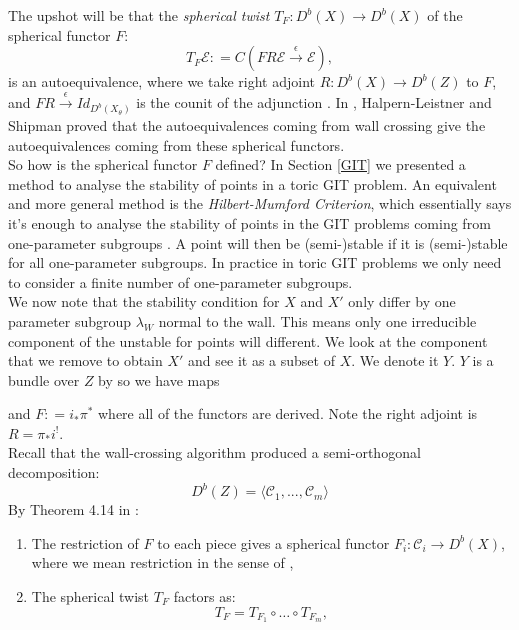 \documentclass[oneside]{amsart}
\theoremstyle{definition}
\theoremstyle{definition}
\theoremstyle{definition}
\theoremstyle{definition}
\newcommand{\defeq}{\mathrel{\mathop:}=}
\newcommand{\Es}{\mathcal{E}}
\begin{document}
The upshot will be that the \textit{spherical twist} $T_F: D^b(X) \to D^b(X)$ of the spherical functor $F$:
\begin{equation}
    T_F \Es \defeq C \left( FR \Es \xrightarrow[]{\epsilon} \Es \right),
\end{equation}   
is an autoequivalence, where we take right adjoint $R : D^b(X) \to D^b(Z)$ to $F$, and $FR \xrightarrow[]{\epsilon} Id_{D^b(X_\theta)}$ is the counit of the adjunction \cite[Section 1]{spherical}. In \cite{gitauto}, Halpern-Leistner and Shipman proved that the autoequivalences coming from wall crossing give the autoequivalences coming from these spherical functors.
\\
\newline
So how is the spherical functor $F$ defined? In Section \ref{GIT} we presented a method to analyse the stability of points in a toric GIT problem. An equivalent and more general method is the \textit{Hilbert-Mumford Criterion}, which essentially says it's enough to analyse the stability of points in the GIT problems coming from one-parameter subgroups \cite{mumford}. A point will then be (semi-)stable if it is (semi-)stable for all one-parameter subgroups. In practice in toric GIT problems we only need to consider a finite number of one-parameter subgroups. \\
\newline
We now note that the stability condition for $X$ and $X'$ only differ by one parameter subgroup $\lambda_W$ normal to the wall. This means only one irreducible component of the unstable for points will different. We look at the component that we remove to obtain $X'$ and see it as a subset of $X$. We denote it $Y$. $Y$ is a bundle over $Z$ by \cite{bialynick} so we have maps
\begin{center}
\end{center}
and $F \defeq i_* \pi^*$ where all of the functors are derived. Note the right adjoint is $R = \pi_* i^!$. \\
\newline
Recall that the wall-crossing algorithm produced a semi-orthogonal decomposition:
$$D^b(Z) =\langle \mathcal{C}_1,...,\mathcal{C}_m\rangle $$
By Theorem 4.14 in \cite{gitauto}:
\begin{enumerate}
    \item The restriction of $F$ to each piece gives a spherical functor $F_i : \mathcal{C}_i \to D^b(X)$, where we mean restriction in the sense of \cite[Chapter 1]{huybrechts},
    \item The spherical twist $T_F$ factors as:
    \begin{equation}
        \label{twistfactors}
        T_F = T_{F_1} \circ \dots \circ T_{F_m},
    \end{equation}
\end{enumerate}
\end{document}
